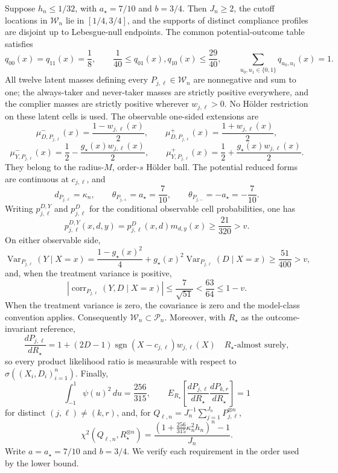 Suppose \(h_n\le 1/32\), with \(a_\star=7/10\) and \(b=3/4\).  Then \(J_n\ge2\), the cutoff locations in \(\mathcal W_n\) lie in \([1/4,3/4]\), and the supports of distinct compliance profiles are disjoint up to Lebesgue-null endpoints.  The common potential-outcome table satisfies
\[
 q_{00}(x)=q_{11}(x)=\frac18,
 \qquad
 \frac1{40}\le q_{01}(x),q_{10}(x)\le\frac{29}{40},
 \qquad
 \sum_{u_0,u_1\in\{0,1\}}q_{u_0,u_1}(x)=1.
\]
All twelve latent masses defining every \(P_{j,\ell}\in\mathcal W_n\) are nonnegative and sum to one; the always-taker and never-taker masses are strictly positive everywhere, and the complier masses are strictly positive wherever \(w_{j,\ell}>0\).  No H\"older restriction on these latent cells is used.  The observable one-sided extensions are
\[
 \mu_{D,P_{j,\ell}}^{-}(x)=\frac{1-w_{j,\ell}(x)}2,
 \qquad
 \mu_{D,P_{j,\ell}}^{+}(x)=\frac{1+w_{j,\ell}(x)}2,
\]
\[
 \mu_{Y,P_{j,\ell}}^{-}(x)=\frac12-\frac{g_\star(x)w_{j,\ell}(x)}2,
 \qquad
 \mu_{Y,P_{j,\ell}}^{+}(x)=\frac12+\frac{g_\star(x)w_{j,\ell}(x)}2.
\]
They belong to the radius-\(M\), order-\(s\) H\"older ball.  The potential reduced forms are continuous at \(c_{j,\ell}\), and
\[
 d_{P_{j,\ell}}=\kappa_n,
 \qquad
 \theta_{P_{j,+}}=a_\star=\frac7{10},
 \qquad
 \theta_{P_{j,-}}=-a_\star=-\frac7{10}.
\]
Writing \(p_{j,\ell}^{D,Y}\) and \(p_{j,\ell}^{D}\) for the conditional observable cell probabilities, one has
\[
 p_{j,\ell}^{D,Y}(x,d,y)
 =p_{j,\ell}^{D}(x,d)m_{d,y}(x)
 \ge\frac{21}{320}>v.
\]
On either observable side,
\[
 \operatorname{Var}_{P_{j,\ell}}(Y\mid X=x)
 =\frac{1-g_\star(x)^2}{4}
  +g_\star(x)^2\operatorname{Var}_{P_{j,\ell}}(D\mid X=x)
 \ge\frac{51}{400}>v,
\]
and, when the treatment variance is positive,
\[
 \left|\operatorname{corr}_{P_{j,\ell}}(Y,D\mid X=x)\right|
 \le\frac7{\sqrt{51}}<\frac{63}{64}\le1-v.
\]
When the treatment variance is zero, the covariance is zero and the model-class convention applies.  Consequently \(\mathcal W_n\subset\mathcal P_n\).  Moreover, with \(R_\star\) as the outcome-invariant reference,
\[
 \frac{dP_{j,\ell}}{dR_\star}
 =1+(2D-1)\operatorname{sgn}(X-c_{j,\ell})w_{j,\ell}(X)
 \quad R_\star\text{-almost surely},
\]
so every product likelihood ratio is measurable with respect to \(\sigma((X_i,D_i)_{i=1}^n)\).  Finally,
\[
 \int_{-1}^{1}\psi(u)^2\,du=\frac{256}{315},
 \qquad
 E_{R_\star}\!\left[
 \frac{dP_{j,\ell}}{dR_\star}
 \frac{dP_{k,r}}{dR_\star}
 \right]=1
\]
for distinct \((j,\ell)\ne(k,r)\), and, for
\(Q_{\ell,n}=J_n^{-1}\sum_{j=1}^{J_n}P_{j,\ell}^{\otimes n}\),
\[
 \chi^2(Q_{\ell,n},R_\star^{\otimes n})
 =\frac{\left(1+\frac{256}{315}\kappa_n^2h_n\right)^n-1}{J_n}.
\]
Write \(a=a_\star=7/10\) and \(b=3/4\).  We verify each requirement in the order used by the lower bound.

